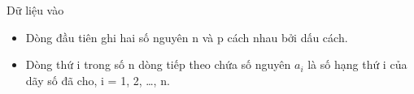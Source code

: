 Dữ liệu vào
\begin{itemize}
	\item     Dòng đầu tiên ghi hai số nguyên n và p cách nhau bởi dấu cách.   
	\item     Dòng thứ i trong số n dòng tiếp theo chứa số nguyên $a_{i}$    là số hạng thứ i của dãy số đã  cho, i = 1, 2, …, n.   
\end{itemize}
